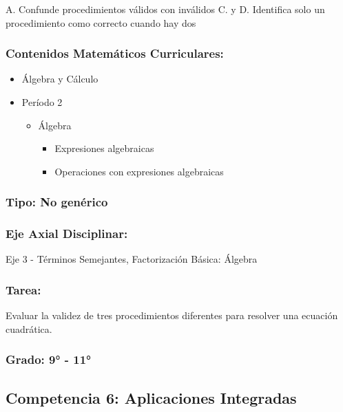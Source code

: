\documentclass[
]{article}
\providecommand{\tightlist}{%
  \setlength{\itemsep}{0pt}\setlength{\parskip}{0pt}}
\begin{document}
A. Confunde procedimientos válidos con inválidos C. y D. Identifica solo
un procedimiento como correcto cuando hay dos

\subsubsection{Contenidos Matemáticos
Curriculares:}\label{contenidos-matemuxe1ticos-curriculares-2}

\begin{itemize}
\tightlist
\item
  Álgebra y Cálculo
\item
  Período 2

  \begin{itemize}
  \tightlist
  \item
    Álgebra

    \begin{itemize}
    \tightlist
    \item
      Expresiones algebraicas
    \item
      Operaciones con expresiones algebraicas
    \end{itemize}
  \end{itemize}
\end{itemize}

\subsubsection{Tipo: No genérico}\label{tipo-no-genuxe9rico}

\subsubsection{Eje Axial Disciplinar:}\label{eje-axial-disciplinar-1}

Eje 3 - Términos Semejantes, Factorización Básica: Álgebra

\subsubsection{Tarea:}\label{tarea-1}

Evaluar la validez de tres procedimientos diferentes para resolver una
ecuación cuadrática.

\subsubsection{Grado: 9° - 11°}\label{grado-9---11}

\subsection{Competencia 6: Aplicaciones
Integradas}\label{competencia-6-aplicaciones-integradas}
\end{document}
